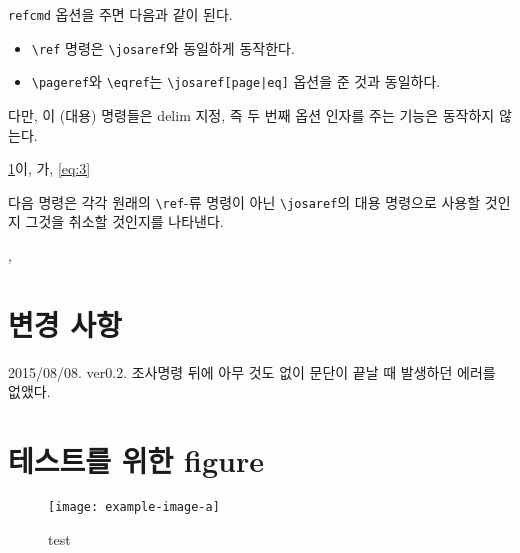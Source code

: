 \documentclass[polyglossia,a4paper,12pt,kosection]{oblivoir}
\begin{document}
\verb|refcmd| 옵션을 주면 다음과 같이 된다.
\begin{itemize} \tightlist
\item \verb|\ref| 명령은 \verb|\josaref|와 동일하게 동작한다.
\item \verb|\pageref|와 \verb|\eqref|는 \verb+\josaref[page|eq]+ 옵션을 준 것과 동일하다.
\end{itemize}

다만, 이 (대용) 명령들은 delim 지정, 즉 두 번째 옵션 인자를 주는 기능은 동작하지 않는다.

\medskip

\begin{coderesult}
\ref{fig:test1}이, \pageref{fig:test2}가, \eqref{eq:3}
\end{coderesult}

다음 명령은 각각 원래의 \verb|\ref|-류 명령이 아닌 \verb|\josaref|의 대용 명령으로 사용할 것인지
그것을 취소할 것인지를 나타낸다.

\medskip 

\begin{code}
\josarefcmds, \nojosarefcmds
\end{code}

\section{변경 사항}

\hangfrom{\textbullet\ \ }2015/08/08. ver0.2. 조사명령 뒤에 아무 것도 없이 문단이 끝날 때 발생하던 에러를 없앴다.



\clearpage

\section{테스트를 위한 figure}


 \begin{figure}
 \centering
 \texttt{[image: example-image-a]}
  \caption{test}\label{fig:test1}
 \end{figure}
\end{document}
